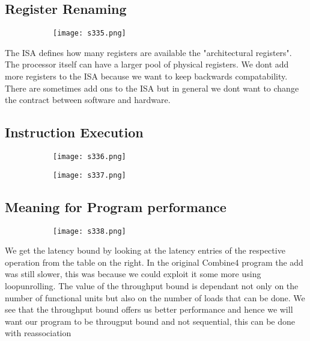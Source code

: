 \documentclass[8pt]{extreport}
\begin{document}
\subsection{Register Renaming}
\begin{figure}[H]
\begin{subfigure}[b]{0.4\linewidth}
\texttt{[image: s335.png]}
\end{subfigure}
\end{figure}
The ISA defines how many registers are available the "architectural registers". The processor itself can have a larger pool of physical registers. We dont add more registers to the ISA because we want to keep backwards compatability. There are sometimes add ons to the ISA but in general we dont want to change the contract between software and hardware. 

\subsection{Instruction Execution}
\begin{figure}[H]
\begin{subfigure}[b]{0.4\linewidth}
\texttt{[image: s336.png]}
\end{subfigure}
\begin{subfigure}[b]{0.4\linewidth}
\texttt{[image: s337.png]}
\end{subfigure}
\end{figure}

\subsection{Meaning for Program performance}
\begin{figure}[H]
\begin{subfigure}[b]{0.4\linewidth}
\texttt{[image: s338.png]}
\end{subfigure}
\end{figure}
We get the latency bound by looking at the latency entries of the respective operation from the table on the right. In the original Combine4 program the add was still slower, this was because we could exploit it some more using loopunrolling. The value of the throughput bound is dependant not only on the number of functional units but also on the number of loads that can be done. We see that the throughput bound offers us better performance and hence we will want our program to be througput bound and not sequential, this can be done with reassociation
\end{document}
